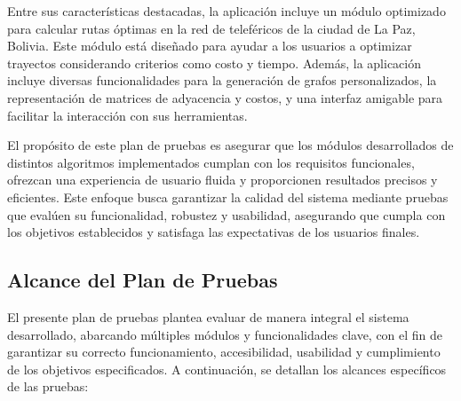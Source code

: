 \documentclass[stu, 12pt, letterpaper, donotrepeattitle, floatsintext, natbib]{apa7}
\begin{document}
\noindent Entre sus caracter\'isticas destacadas, la aplicaci\'on incluye un m\'odulo optimizado para calcular rutas \'optimas en la red de telef\'ericos de la ciudad de La Paz, Bolivia. Este m\'odulo est\'a dise\~nado para ayudar a los usuarios a optimizar trayectos considerando criterios como costo y tiempo. Adem\'as, la aplicaci\'on incluye diversas funcionalidades para la generaci\'on de grafos personalizados, la representaci\'on de matrices de adyacencia y costos, y una interfaz amigable para facilitar la interacci\'on con sus herramientas.

\noindent El prop\'osito de este plan de pruebas es asegurar que los m\'odulos desarrollados de distintos algoritmos implementados cumplan con los requisitos funcionales, ofrezcan una experiencia de usuario fluida y proporcionen resultados precisos y eficientes. Este enfoque busca garantizar la calidad del sistema mediante pruebas que eval\'uen su funcionalidad, robustez y usabilidad, asegurando que cumpla con los objetivos establecidos y satisfaga las expectativas de los usuarios finales.



\subsection{Alcance del Plan de Pruebas}

El presente plan de pruebas plantea evaluar de manera integral el sistema desarrollado, abarcando múltiples módulos y funcionalidades clave, con el fin de garantizar su correcto funcionamiento, accesibilidad, usabilidad y cumplimiento de los objetivos especificados. A continuación, se detallan los alcances específicos de las pruebas:
\end{document}
